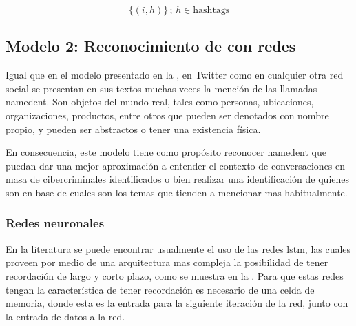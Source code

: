 \begin{equation} \label{eq:ovr-inverse-transform}
    \{(i, h)\} \,;\, h \in \text{hashtags}
\end{equation}


\subsection{Modelo 2: Reconocimiento de  con redes }
Igual que en el modelo presentado en la , en Twitter como en cualquier otra red social se presentan en sus textos muchas veces la mención de las llamadas \gls{namedent}. Son objetos del mundo real, tales como personas, ubicaciones, organizaciones, productos, entre otros que pueden ser denotados con nombre propio, y pueden ser abstractos o tener una existencia física.

En consecuencia, este modelo tiene como propósito reconocer \gls{namedent} que puedan dar una mejor aproximación a entender el contexto de conversaciones en masa de cibercriminales identificados o bien realizar una identificación de quienes son en base de cuales son los temas que tienden a mencionar mas habitualmente.

\subsubsection{Redes neuronales }
En la literatura se puede encontrar usualmente el uso de las redes \gls{lstm}, las cuales proveen por medio de una arquitectura mas compleja la posibilidad de tener recordación de largo y corto plazo, como se muestra en la . Para que estas redes tengan la característica de tener recordación es necesario de una celda de memoria, donde esta es la entrada para la siguiente iteración de la red, junto con la entrada de datos a la red.

